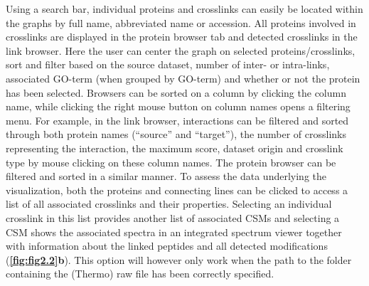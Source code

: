 Using a search bar, individual proteins and crosslinks can easily be located within the graphs by full name, abbreviated name or accession. All proteins involved in crosslinks are displayed in the protein browser tab and detected crosslinks in the link browser. Here the user can center the graph on selected proteins/crosslinks, sort and filter based on the source dataset, number of inter- or intra-links, associated GO-term (when grouped by GO-term) and whether or not the protein has been selected. Browsers can be sorted on a column by clicking the column name, while clicking the right mouse button on column names opens a filtering menu. For example, in the link browser, interactions can be filtered and sorted through both protein names (“source” and “target”), the number of crosslinks representing the interaction, the maximum score, dataset origin and crosslink type by mouse clicking on these column names. The protein browser can be filtered and sorted in a similar manner. To assess the data underlying the visualization, both the proteins and connecting lines can be clicked to access a list of all associated crosslinks and their properties. Selecting an individual crosslink in this list provides another list of associated CSMs and selecting a CSM shows the associated spectra in an integrated spectrum viewer together with information about the linked peptides and all detected modifications (\textbf{\autoref{fig:fig2.2}b}). This option will however only work when the path to the folder containing the (Thermo) raw file has been correctly specified.


